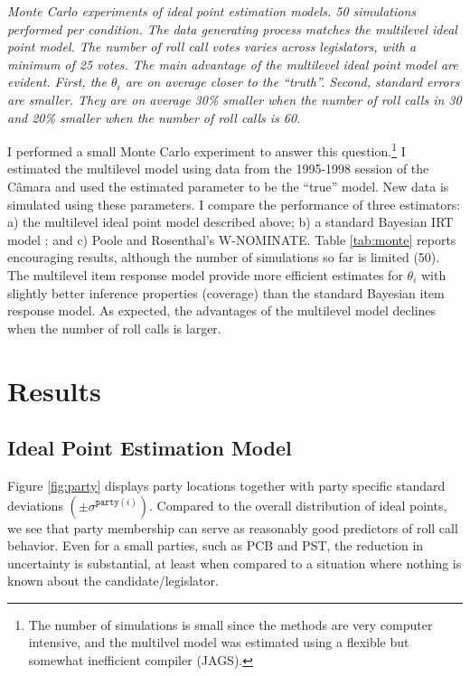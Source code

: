 \begin{table}[h]

\label{tab:monte}
\caption{\emph{Monte Carlo experiments of ideal point estimation models. 50 simulations performed per condition. The data generating process matches the multilevel ideal point model. The number of roll call votes varies across legislators, with a minimum of 25 votes. The main advantage of the multilevel ideal point model are evident. First,  the $\theta_i$ are on average closer to the ``truth''. Second, standard errors are smaller.  They are on average 30\% smaller when the number of roll calls in 30 and 20\% smaller when the number of roll calls is 60.}}
\end{table}

I performed a small Monte Carlo experiment to answer this question.\footnote{The number of simulations is small since the methods are very computer intensive, and the multilvel model was estimated using a flexible but somewhat inefficient compiler (JAGS).} I estimated the multilevel model using data from the 1995-1998  session of the Câmara and  used the estimated parameter to be the ``true'' model. New data is simulated using these parameters. I compare the performance  of  three estimators: a) the multilevel ideal point model described above; b) a standard Bayesian IRT model \cite{Martin:2007}; and c)  Poole and Rosenthal's W-NOMINATE\citeyear{poole:1997}. Table \ref{tab:monte} reports encouraging results, although the number of simulations so far is limited (50). The multilevel item response model provide more efficient estimates for  $\theta_i$  with slightly better   inference properties (coverage) than the standard Bayesian item response model. As expected, the advantages of the multilevel model declines when the number of roll calls is larger. 

\section{Results}


\subsection*{Ideal Point Estimation Model}

Figure \ref{fig:party} displays party locations together with  party specific standard deviations $(\pm\sigma^{\mathtt{party}(i)})$. Compared to the overall distribution of ideal points, we see that party membership can serve as reasonably good predictors of roll call behavior. Even for a small parties, such as PCB and PST, the reduction in uncertainty is substantial, at least when compared to a situation where nothing is known about the candidate/legislator. %

